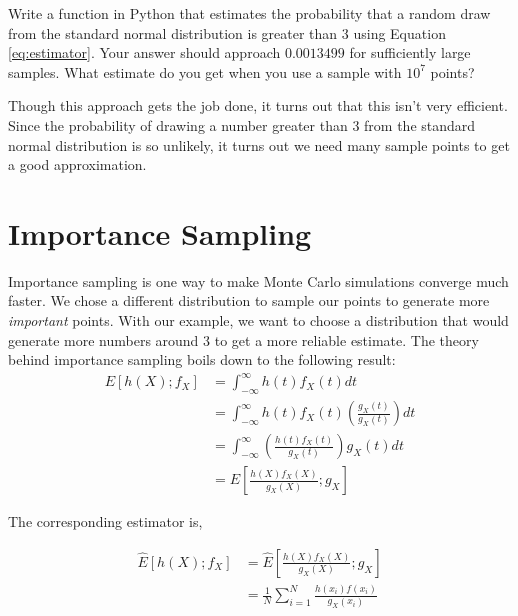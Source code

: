 \begin{problem} \label{prob:mc}
Write a function in Python that estimates the probability that a random draw from the standard normal distribution is greater than 3 using Equation \ref{eq:estimator}. Your answer should approach $0.0013499$ for sufficiently large samples. What estimate do you get when you use a sample with $10^7$ points?
\end{problem}

Though this approach gets the job done, it turns out that this isn't very efficient. Since the probability of drawing a number greater than $3$ from the standard normal distribution is so unlikely, it turns out we need many sample points to get a good approximation.

\section*{Importance Sampling}
Importance sampling is one way to make Monte Carlo simulations converge much faster. We chose a different distribution to sample our points to generate more \emph{important} points. With our example, we want to choose a distribution that would generate more numbers around 3 to get a more reliable estimate. The theory behind importance sampling boils down to the following result:
\begin{equation} \label{eq:importance}
\begin{split}
E[h(X);f_X] & = \int_{-\infty}^{\infty} h(t)f_X(t) dt \\
& = \int_{-\infty}^{\infty} h(t)f_X(t)\left ( \frac{g_X(t)}{g_X(t)} \right ) dt \\
& = \int_{-\infty}^{\infty} \left ( \frac{h(t)f_X(t)}{g_X(t)} \right )g_X(t) dt \\
& = E\left [ \frac{h(X)f_X(X)}{g_X(X)} ; g_X \right ]
\end{split}
\end{equation}

The corresponding estimator is,

\begin{equation*}
\begin{split}
\widehat{E}[h(X);f_X] & = \widehat{E}\left [ \frac{h(X)f_X(X)}{g_X(X)} ; g_X \right ] \\
& = \frac{1}{N}\sum_{i = 1}^{N}\frac{h(x_i)f(x_i)}{g_X(x_i)}
\end{split}
\end{equation*}

